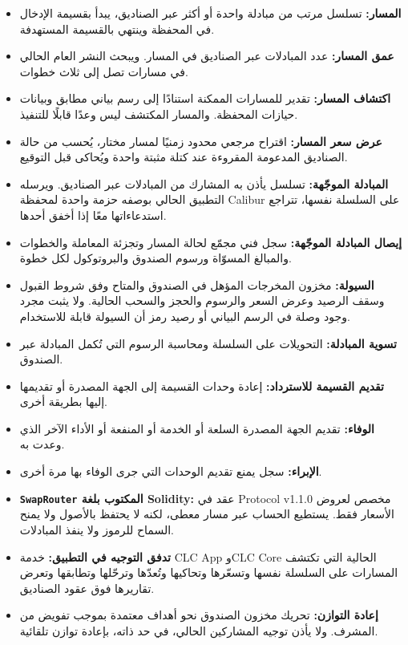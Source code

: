 \documentclass[11pt]{article}
\begin{document}
\begin{itemize}[leftmargin=*]
\item \textbf{المسار:} تسلسل مرتب من مبادلة واحدة أو أكثر عبر الصناديق، يبدأ بقسيمة الإدخال في المحفظة وينتهي بالقسيمة المستهدفة.
\item \textbf{عمق المسار:} عدد المبادلات عبر الصناديق في المسار. ويبحث النشر العام الحالي في مسارات تصل إلى ثلاث خطوات.
\item \textbf{اكتشاف المسار:} تقدير للمسارات الممكنة استنادًا إلى رسم بياني مطابق وبيانات حيازات المحفظة. والمسار المكتشف ليس وعدًا قابلًا للتنفيذ.
\item \textbf{عرض سعر المسار:} اقتراح مرجعي محدود زمنيًا لمسار مختار، يُحسب من حالة الصناديق المدعومة المقروءة عند كتلة مثبتة واحدة ويُحاكى قبل التوقيع.
\item \textbf{المبادلة الموجّهة:} تسلسل يأذن به المشارك من المبادلات عبر الصناديق. ويرسله التطبيق الحالي بوصفه حزمة واحدة لمحفظة Calibur على السلسلة نفسها، تتراجع استدعاءاتها معًا إذا أخفق أحدها.
\item \textbf{إيصال المبادلة الموجّهة:} سجل فني مجمّع لحالة المسار وتجزئة المعاملة والخطوات والمبالغ المسوّاة ورسوم الصندوق والبروتوكول لكل خطوة.
\item \textbf{السيولة:} مخزون المخرجات المؤهل في الصندوق والمتاح وفق شروط القبول وسقف الرصيد وعرض السعر والرسوم والحجز والسحب الحالية. ولا يثبت مجرد وجود وصلة في الرسم البياني أو رصيد رمز أن السيولة قابلة للاستخدام.
\item \textbf{تسوية المبادلة:} التحويلات على السلسلة ومحاسبة الرسوم التي تُكمل المبادلة عبر الصندوق.
\item \textbf{تقديم القسيمة للاسترداد:} إعادة وحدات القسيمة إلى الجهة المصدرة أو تقديمها إليها بطريقة أخرى.
\item \textbf{الوفاء:} تقديم الجهة المصدرة السلعة أو الخدمة أو المنفعة أو الأداء الآخر الذي وعدت به.
\item \textbf{الإبراء:} سجل يمنع تقديم الوحدات التي جرى الوفاء بها مرة أخرى.
\item \textbf{\texttt{SwapRouter} المكتوب بلغة Solidity:} عقد في Protocol v1.1.0 مخصص لعروض الأسعار فقط. يستطيع الحساب عبر مسار معطى، لكنه لا يحتفظ بالأصول ولا يمنح السماح للرموز ولا ينفذ المبادلات.
\item \textbf{تدفق التوجيه في التطبيق:} خدمة CLC App وCLC Core الحالية التي تكتشف المسارات على السلسلة نفسها وتسعّرها وتحاكيها وتُعدّها وترحّلها وتطابقها وتعرض تقاريرها فوق عقود الصناديق.
\item \textbf{إعادة التوازن:} تحريك مخزون الصندوق نحو أهداف معتمدة بموجب تفويض من المشرف. ولا يأذن توجيه المشاركين الحالي، في حد ذاته، بإعادة توازن تلقائية.

\end{itemize}
\end{document}
